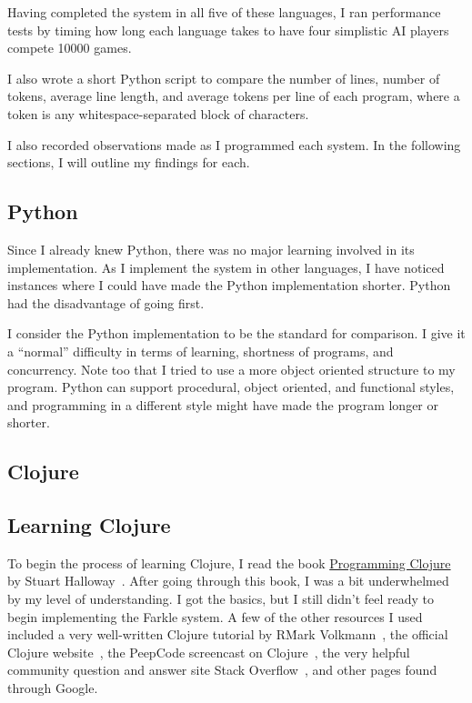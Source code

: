 \documentclass{article}
\begin{document}
Having completed the system in all five of these languages, I ran performance
tests by timing how long each language takes to have four simplistic AI players
compete 10000 games.

I also wrote a short Python script to compare the number of lines, number of
tokens, average line length, and average tokens per line of each program, where
a token is any whitespace-separated block of characters.

I also recorded observations made as I programmed each system.  In the following
sections, I will outline my findings for each.

\subsection{Python}

Since I already knew Python, there was no major learning involved in its
implementation.  As I implement the system in other languages, I have noticed
instances where I could have made the Python implementation shorter.  Python had
the disadvantage of going first.

I consider the Python implementation to be the standard for comparison.  I give
it a ``normal'' difficulty in terms of learning, shortness of programs, and
concurrency.  Note too that I tried to use a more object oriented structure to
my program.  Python can support procedural, object oriented, and functional
styles, and programming in a different style might have made the program longer
or shorter.

\subsection{Clojure}

\subsection{Learning Clojure}

To begin the process of learning Clojure, I read the book \underline{Programming
Clojure} by Stuart Halloway~\cite{clojurebook}.  After going through this book,
I was a bit underwhelmed by my level of understanding.  I got the basics, but I
still didn't feel ready to begin implementing the Farkle system.  A few of the
other resources I used included a very well-written Clojure tutorial by R\. Mark
Volkmann~\cite{clojuretutorial}, the official Clojure
website~\cite{clojuredotorg}, the PeepCode screencast on
Clojure~\cite{peepcodeclojure}, the very helpful community question and answer
site Stack Overflow~\cite{stackoverflow}, and other pages found through Google.
\end{document}
